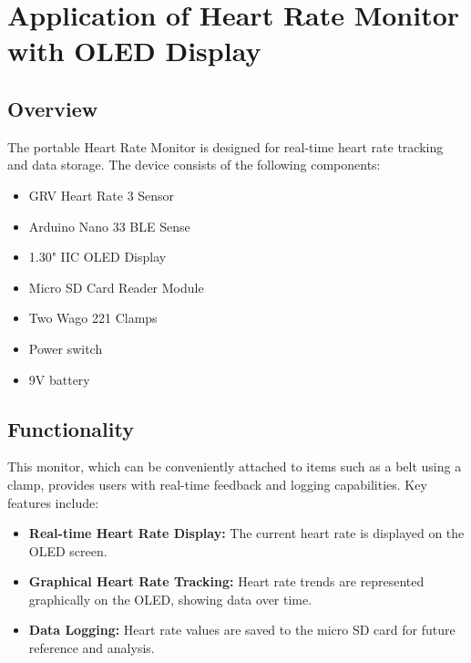 %
%
%


\chapter{Application of Heart Rate Monitor with OLED Display}

\section{Overview}

The portable Heart Rate Monitor is designed for real-time heart rate tracking and data storage. The device consists of the following components:

\begin{itemize}
    \item GRV Heart Rate 3 Sensor
    \item Arduino Nano 33 BLE Sense
    \item 1.30" IIC OLED Display
    \item Micro SD Card Reader Module
    \item Two Wago 221 Clamps
    \item Power switch
    \item 9V battery
\end{itemize}


\section{Functionality}

This monitor, which can be conveniently attached to items such as a belt using a clamp, provides users with real-time feedback and logging capabilities. Key features include:
\begin{itemize}
    \item \textbf{Real-time Heart Rate Display:} The current heart rate is displayed on the OLED screen.
    \item \textbf{Graphical Heart Rate Tracking:} Heart rate trends are represented graphically on the OLED, showing data over time.
    \item \textbf{Data Logging:} Heart rate values are saved to the micro SD card for future reference and analysis.
\end{itemize}

